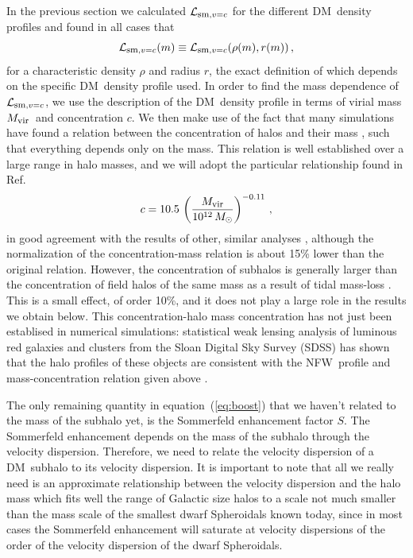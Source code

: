 \documentclass[aps,prd,twocolumn,amsmath,amssymb,floatfix,nofootinbib,10pt]{revtex4}
\newcommand{\NFW}{NFW}
\newcommand{\DM}{DM}
\newcommand{\somm}{\ensuremath{S}}
\newcommand{\eqnname}{equation}
\newcommand{\lum}{\ensuremath{\mathcal{L}}}
\newcommand{\lumsmoothc}{\ensuremath{\lum_{\mbox{{\footnotesize sm}},v=c}}}
\newcommand{\Msol}{\ensuremath{M_{\odot}}}
\newcommand{\Mvir}{\ensuremath{M_{\mbox{{\footnotesize vir}}}}}
\newcommand{\conc}{\ensuremath{c}}
\newcommand{\SDSS}{SDSS}
\begin{document}
In the previous section we calculated $\lumsmoothc$ for the different
\DM\ density profiles and found in all cases that
\begin{equation}
\lumsmoothc(m) \equiv \lumsmoothc(\rho(m),r(m))\, ,
\end{equation}
for a characteristic density $\rho$ and radius $r$, the exact
definition of which depends on the specific \DM\ density profile
used. In order to find the mass dependence of $\lumsmoothc$, we use
the description of the \DM\ density profile in terms of virial mass
\Mvir\ and concentration \conc. We then make use of the fact that many
simulations have found a relation between the concentration of halos
and their mass
\cite{2001MNRAS.321..559B,2001ApJ...554..114E,2008MNRAS.387..536G,2007MNRAS.381.1450N},
such that everything depends only on the mass. This relation is well
established over a large range in halo masses, and we will adopt the
particular relationship found in Ref.~\cite{2007MNRAS.378...55M}
\begin{equation}\label{eq:concscaling}
\conc = 10.5 \, \left(\frac{\Mvir}{10^{12}\, \Msol}\right)^{-0.11}\, ,
\end{equation}
in good agreement with the results of other, similar analyses
\cite{2001MNRAS.321..559B,2005MNRAS.357..387K}, although the
normalization of the concentration-mass relation is about 15\% lower
than the original relation. However, the concentration of subhalos is
generally larger than the concentration of field halos of the same
mass as a result of tidal mass-loss
\cite{1998MNRAS.300..146G,2008ApJ...673..226P,2004MNRAS.355..794H,2005ApJ...635..931B,2004ApJ...608..663K}. This
is a small effect, of order 10\%, and it does not play a large role in
the results we obtain below. This concentration-halo mass
concentration has not just been establised in numerical simulations:
statistical weak lensing analysis of luminous red galaxies and
clusters from the Sloan Digital Sky Survey (\SDSS) has shown that the
halo profiles of these objects are consistent with the \NFW\ profile
and mass-concentration relation given above
\cite{2008JCAP...08..006M}.

The only remaining quantity in \eqnname\ (\ref{eq:boost}) that we
haven't related to the mass of the subhalo yet, is the Sommerfeld
enhancement factor \somm. The Sommerfeld enhancement depends on the
mass of the subhalo through the velocity dispersion. Therefore, we
need to relate the velocity dispersion of a \DM\ subhalo to its
velocity dispersion. It is important to note that all we really need
is an approximate relationship between the velocity dispersion and the
halo mass which fits well the range of Galactic size halos to a scale
not much smaller than the mass scale of the smallest dwarf Spheroidals
known today, since in most cases the Sommerfeld enhancement will
saturate at velocity dispersions of the order of the velocity
dispersion of the dwarf Spheroidals.
\end{document}
